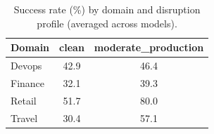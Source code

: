 \begin{table}[h]
\centering
\caption{Success rate (\%) by domain and disruption profile (averaged across models).}
\label{tab:per-domain}
\begin{tabular}{lcc}
\toprule
\textbf{Domain} & \textbf{clean} & \textbf{moderate_production} \\
\midrule
Devops & 42.9 & 46.4 \\
Finance & 32.1 & 39.3 \\
Retail & 51.7 & 80.0 \\
Travel & 30.4 & 57.1 \\
\bottomrule
\end{tabular}
\end{table}
